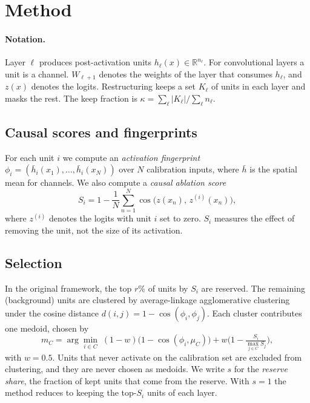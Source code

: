 \documentclass[11pt]{article}
\begin{document}
\section{Method}
\label{sec:method}

\paragraph{Notation.}
Layer $\ell$ produces post-activation units $h_\ell(x)\in\mathbb{R}^{n_\ell}$. For convolutional layers a
unit is a channel. $W_{\ell+1}$ denotes the weights of the layer that consumes $h_\ell$, and $z(x)$ denotes
the logits. Restructuring keeps a set $K_\ell$ of units in each layer and masks the rest. The keep fraction
is $\kappa=\sum_\ell|K_\ell|/\sum_\ell n_\ell$.

\subsection{Causal scores and fingerprints}
For each unit $i$ we compute an \emph{activation fingerprint}
$\phi_i=(\bar h_i(x_1),\dots,\bar h_i(x_N))$ over $N$ calibration inputs, where $\bar h$ is the spatial
mean for channels. We also compute a \emph{causal ablation score}
\begin{equation}
  S_i = 1-\frac{1}{N}\sum_{n=1}^N \cos\!\big(z(x_n),\,z^{(i)}(x_n)\big),
\end{equation}
where $z^{(i)}$ denotes the logits with unit $i$ set to zero. $S_i$ measures the effect of removing the
unit, not the size of its activation.

\subsection{Selection}
In the original framework, the top $r\%$ of units by $S_i$ are reserved. The remaining (background) units
are clustered by average-linkage agglomerative clustering under the cosine distance
$d(i,j)=1-\cos(\phi_i,\phi_j)$. Each cluster contributes one medoid, chosen by
\begin{equation}
  m_C=\arg\min_{i\in C}\;(1-w)\big(1-\cos(\phi_i,\mu_C)\big)+w\Big(1-\tfrac{S_i}{\max_{j\in C}S_j}\Big),
\end{equation}
with $w=0.5$. Units that never activate on the calibration set are excluded from clustering, and they
are never chosen as medoids. We write $s$ for the \emph{reserve share}, the fraction of kept units that
come from the reserve. With $s=1$ the method reduces to keeping the top-$S_i$ units of each layer.
\end{document}
